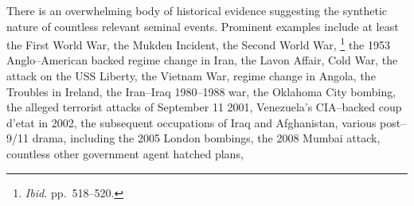 There is an overwhelming body of historical evidence suggesting the synthetic nature of countless relevant seminal events. Prominent examples include at least the First World War,
the Mukden Incident,
the Second World War,
\footnotecite[extras={ p.~193.}][shirer1960]\footnote{{\it Ibid.} pp.~518--520.} %
the 1953 Anglo--American backed regime change in Iran,
\footnotecite[gasiorowski2000] %
the Lavon Affair,
Cold War,
\footnotecite[northwoods]
the attack on the USS Liberty,
the Vietnam War,
\footnotecite[bumiller2010] %
regime change in Angola,
the Troubles in Ireland,
the Iran--Iraq 1980--1988 war,
the Oklahoma City bombing,
the alleged terrorist attacks of September 11 2001, %
\footnotecite[gourley2012] 
\footnotecite[harrit2009]
Venezuela's CIA--backed coup d'etat in 2002, %
the subsequent occupations of Iraq %
and Afghanistan, %
\footnotecite[extras={ p.~74.}][grad2009]
various post--9/11 drama, %
\footnotecite[king2010]
including the 2005 London bombings, %
\footnotecite[secker2010] 
the 2008 Mumbai attack, %
countless other government agent hatched plans, %
